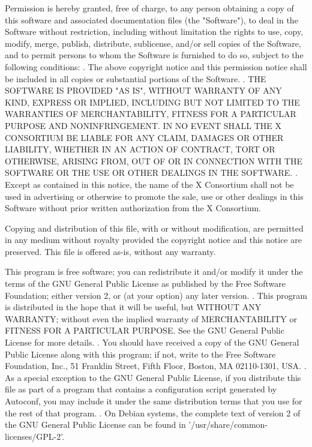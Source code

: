 \begin{script}
 Permission is hereby granted, free of charge, to any person obtaining
 a copy of this software and associated documentation files (the
 "Software"), to deal in the Software without restriction, including
 without limitation the rights to use, copy, modify, merge, publish,
 distribute, sublicense, and/or sell copies of the Software, and to
 permit persons to whom the Software is furnished to do so, subject to
 the following conditions:
 .
 The above copyright notice and this permission notice shall be included
 in all copies or substantial portions of the Software.
 .
 THE SOFTWARE IS PROVIDED "AS IS", WITHOUT WARRANTY OF ANY KIND, EXPRESS
 OR IMPLIED, INCLUDING BUT NOT LIMITED TO THE WARRANTIES OF
 MERCHANTABILITY, FITNESS FOR A PARTICULAR PURPOSE AND NONINFRINGEMENT.
 IN NO EVENT SHALL THE X CONSORTIUM BE LIABLE FOR ANY CLAIM, DAMAGES OR
 OTHER LIABILITY, WHETHER IN AN ACTION OF CONTRACT, TORT OR OTHERWISE,
 ARISING FROM, OUT OF OR IN CONNECTION WITH THE SOFTWARE OR THE USE OR
 OTHER DEALINGS IN THE SOFTWARE.
 .
 Except as contained in this notice, the name of the X Consortium shall
 not be used in advertising or otherwise to promote the sale, use or
 other dealings in this Software without prior written authorization
 from the X Consortium.
 
 Copying and distribution of this file, with or without modification, 
 are permitted in any medium without royalty provided the copyright 
 notice and this notice are preserved. 
 This file is offered as-is, without any warranty.
 
 This program is free software; you can redistribute it and/or modify
 it under the terms of the GNU General Public License as published by
 the Free Software Foundation; either version 2, or (at your option)
 any later version.
 .
 This program is distributed in the hope that it will be useful,
 but WITHOUT ANY WARRANTY; without even the implied warranty of
 MERCHANTABILITY or FITNESS FOR A PARTICULAR PURPOSE.  See the
 GNU General Public License for more details.
 .
 You should have received a copy of the GNU General Public License
 along with this program; if not, write to the Free Software
 Foundation, Inc., 51 Franklin Street, Fifth Floor, Boston, MA
 02110-1301, USA.
 .
 As a special exception to the GNU General Public License, if you
 distribute this file as part of a program that contains a
 configuration script generated by Autoconf, you may include it under
 the same distribution terms that you use for the rest of that program.
 .
 On Debian systems, the complete text of version 2 of the GNU General
 Public License can be found in '/usr/share/common-licenses/GPL-2'.
\end{script}
\newpage
